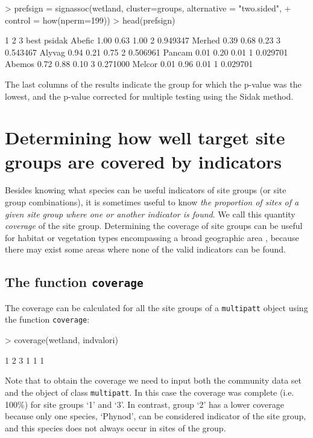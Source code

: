 \documentclass[11pt,a4paper]{article}
\begin{document}
\begin{Schunk}
\begin{Sinput}
> prefsign = signassoc(wetland, cluster=groups,  alternative = "two.sided", 
+                      control = how(nperm=199)) 
> head(prefsign)
\end{Sinput}
\begin{Soutput}
          1    2    3 best   psidak
Abefic 1.00 0.63 1.00    2 0.949347
Merhed 0.39 0.68 0.23    3 0.543467
Alyvag 0.94 0.21 0.75    2 0.506961
Pancam 0.01 0.20 0.01    1 0.029701
Abemos 0.72 0.88 0.10    3 0.271000
Melcor 0.01 0.96 0.01    1 0.029701
\end{Soutput}
\end{Schunk}
The last columns of the results indicate the group for which the p-value was the lowest, and the p-value corrected for multiple testing using the Sidak method.

\section{Determining how well target site groups are covered by indicators}
Besides knowing what species can be useful indicators of site groups (or site group combinations), it is sometimes useful to know \emph{the proportion of sites of a given site group where one or another indicator is found}. We call this quantity \emph{coverage} of the site group. Determining the coverage of site groups can be useful for habitat or vegetation types encompassing a broad geographic area \citep{DeCaceres2012}, because there may exist some areas where none of the valid indicators can be found.  
\subsection{The function \texttt{coverage}}
The coverage can be calculated for all the site groups of a \texttt{multipatt} object using the function \texttt{coverage}:
\begin{Schunk}
\begin{Sinput}
> coverage(wetland, indvalori)
\end{Sinput}
\begin{Soutput}
1 2 3 
1 1 1 
\end{Soutput}
\end{Schunk}
Note that to obtain the coverage we need to input both the community data set and the object of class \texttt{multipatt}. In this case the coverage was complete (i.e. 100\%) for site groups `1' and `3'. In contrast, group `2' has a lower coverage because only one species, `Phynod', can be considered indicator of the site group, and this species does not always occur in sites of the group. 
\end{document}
